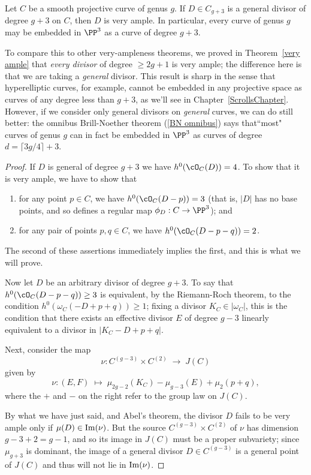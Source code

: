 \begin{theorem}\label{g+3 theorem}
Let $C$ be a smooth projective curve of genus $g$. If $D \in C_{g+3}$ is a general divisor of degree $g+3$ on $C$, then 
$D$ is very ample. In particular, every curve of genus $g$ may be embedded in $\PP^{3}$ as a curve of degree $g+3$.
\end{theorem}

To compare this to other very-ampleness theorems, we proved in Theorem~\ref{very ample} that \emph{every divisor} of degree $\geq 2g+1$ is very ample; the difference here is that we are taking a \emph{general} divisor. This result is sharp in the sense that hyperelliptic curves, for example, cannot be embedded in any projective space as curves of any degree less than $g+3$, as we'll see in Chapter~\ref{ScrollsChapter}. However, if we consider only general divisors on \emph{general} curves, we can do still better: the omnibus Brill-Noether theorem (\ref{BN omnibus}) says that``most" curves of genus $g$ can in fact be embedded in $\PP^{3}$ as curves of degree $d = \lceil 3g/4 \rceil + 3$.

\begin{proof}
If $D$ is general of degree $g+3$ we have $h^0(\cO_C(D)) = 4$. To show that it is very ample, we have to show that
\begin{enumerate}
\item for any point $p \in C$, we have $h^0(\cO_C(D-p)) = 3$ (that is, $|D|$ has no base points, and so defines a regular map $\phi_D : C \to \PP^3$); and
\item for any pair of points $p, q \in C$, we have $h^0(\cO_C(D-p-q)) = 2$.
\end{enumerate}
The second of these assertions immediately implies the first, and this is what we will prove.

Now let $D$ be an arbitrary divisor of degree $g+3$. To say that $h^0(\cO_C(D-p-q)) \geq 3$ is equivalent, by the Riemann-Roch theorem, to the condition $h^0(\omega_C(-D + p + q)) \geq 1$; fixing a divisor 
$K_{C}\in |\omega_{C}|$, this is the condition that there exists  
an effective divisor $E$ of degree $g-3$ linearly equivalent to a divisor in $|K_C - D + p + q|$. 

Next, consider the map 
$$
\nu : C^{(g-3)} \times C^{(2)} \; \to \; J(C)
$$
given by
$$
\nu : (E,F) \; \mapsto \; \mu_{2g-2}(K_C) - \mu_{g-3}(E) + \mu_{2}(p+q), 
$$
where the $+$ and $-$ on the right refer to the group law on $J(C)$. 

By what we have just said, and Abel's theorem, the divisor $D$ fails to be very ample only if
$\mu(D) \in {\rm Im}(\nu)$. But the source $C^{(g-3)} \times C^{(2)}$ of $\nu$ has dimension $g-3+2 = g-1$, and so its image in $J(C)$ must be a proper subvariety; since $\mu_{g+3}$ is dominant, the image of a general divisor $D \in C^{(g-3)}$ is a general point of $J(C)$ and thus will not lie in ${\rm Im}(\nu)$. 
\end{proof}

